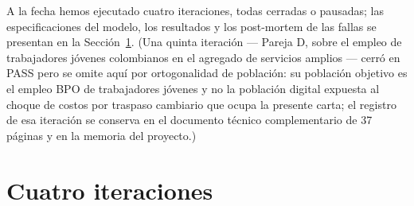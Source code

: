 \documentclass[11pt,a4paper]{article}
\theoremstyle{plain}
\begin{document}
\begin{description}
\begin{itemize}
  \end{itemize}
  \item[Puente hacia \S2.] A la fecha hemos ejecutado cuatro iteraciones, todas cerradas o pausadas; las especificaciones del modelo, los resultados y los post-mortem de las fallas se presentan en la Sección~\ref{sec:2}. (Una quinta iteración --- Pareja D, sobre el empleo de trabajadores jóvenes colombianos en el agregado de servicios amplios --- cerró en PASS pero se omite aquí por ortogonalidad de población: su población objetivo es el empleo BPO de trabajadores jóvenes y no la población digital expuesta al choque de costos por traspaso cambiario que ocupa la presente carta; el registro de esa iteración se conserva en el documento técnico complementario de 37 páginas y en la memoria del proyecto.)
\end{description}

\section{Cuatro iteraciones}\label{sec:2}
\end{document}
